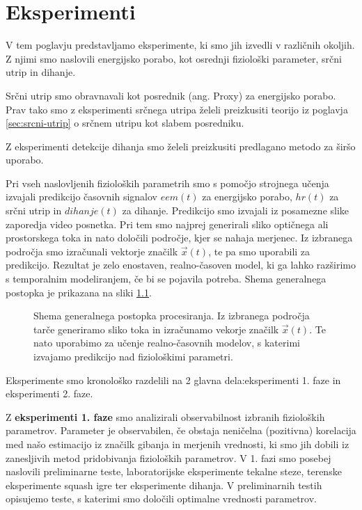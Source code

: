 \chapter{Eksperimenti}\label{sec:eksperimenti}
V tem poglavju predstavljamo eksperimente, ki smo jih izvedli v različnih okoljih. Z njimi smo naslovili energijsko porabo, kot osrednji fiziološki parameter, srčni utrip in dihanje. 

Srčni utrip smo obravnavali kot posrednik (ang. Proxy) za energijsko porabo. Prav tako smo z eksperimenti srčnega utripa želeli preizkusiti teorijo iz poglavja \ref{sec:srcni-utrip} o srčnem utripu kot slabem posredniku.

Z eksperimenti detekcije dihanja smo želeli preizkusiti predlagano metodo za širšo uporabo.

Pri vseh naslovljenih fizioloških parametrih smo s pomočjo strojnega učenja izvajali predikcijo časovnih signalov $eem(t)$ za energijsko porabo, $hr(t)$ za srčni utrip in $dihanje(t)$ za dihanje. Predikcijo smo izvajali iz posamezne slike zaporedja video posnetka. Pri tem smo najprej generirali sliko optičnega ali prostorskega toka in nato določili področje, kjer se nahaja merjenec. Iz izbranega področja smo izračunali vektorje značilk $\vec{x}(t)$, te pa smo uporabili za predikcijo. Rezultat je zelo enostaven, realno-časoven model, ki ga lahko razširimo s temporalnim modeliranjem, če bi se pojavila potreba. Shema generalnega postopka je prikazana na sliki \ref{fig:shema-generalnega-postopka}.

\begin{figure}[!htb]
	\centering
	
	\caption[Shema generalnega postopka procesiranja]{Shema generalnega postopka procesiranja. Iz izbranega področja tarče generiramo sliko toka in izračunamo vekorje značilk $\vec{x}(t)$. Te nato uporabimo za učenje realno-časovnih modelov, s katerimi izvajamo predikcijo nad fiziološkimi parametri.}
	\label{fig:shema-generalnega-postopka}
\end{figure}

Eksperimente smo kronološko razdelili na 2 glavna dela:eksperimenti 1. faze in eksperimenti 2. faze.

Z \textbf{eksperimenti 1. faze} smo analizirali observabilnost izbranih fizioloških parametrov. Parameter je observabilen, če obstaja neničelna (pozitivna) korelacija med našo estimacijo iz značilk gibanja in merjenih vrednosti, ki smo jih dobili iz zanesljivih metod pridobivanja fizioloških parametrov. V 1. fazi smo posebej naslovili preliminarne teste, laboratorijske eksperimente tekalne steze, terenske eksperimente squash igre ter eksperimente dihanja. V {preliminarnih testih} opisujemo teste, s katerimi smo določili optimalne vrednosti parametrov. 


